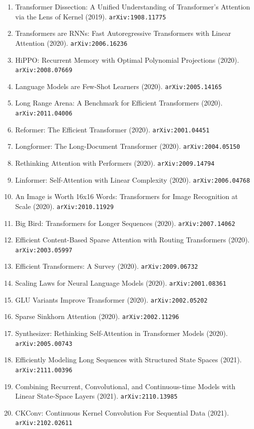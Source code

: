 \documentclass[11pt]{article}
\begin{document}
\begin{enumerate}
  \item Transformer Dissection: A Unified Understanding of Transformer's
  Attention via the Lens of Kernel (2019). \texttt{arXiv:1908.11775}
  \item Transformers are RNNs: Fast Autoregressive Transformers with Linear
  Attention (2020). \texttt{arXiv:2006.16236}
  \item HiPPO: Recurrent Memory with Optimal Polynomial Projections (2020). \texttt{arXiv:2008.07669}
  \item Language Models are Few-Shot Learners (2020). \texttt{arXiv:2005.14165}
  \item Long Range Arena: A Benchmark for Efficient Transformers (2020). \texttt{arXiv:2011.04006}
  \item Reformer: The Efficient Transformer (2020). \texttt{arXiv:2001.04451}
  \item Longformer: The Long-Document Transformer (2020). \texttt{arXiv:2004.05150}
  \item Rethinking Attention with Performers (2020). \texttt{arXiv:2009.14794}
  \item Linformer: Self-Attention with Linear Complexity (2020). \texttt{arXiv:2006.04768}
  \item An Image is Worth 16x16 Words: Transformers for Image Recognition at
  Scale (2020). \texttt{arXiv:2010.11929}
  \item Big Bird: Transformers for Longer Sequences (2020). \texttt{arXiv:2007.14062}
  \item Efficient Content-Based Sparse Attention with Routing Transformers (2020). \texttt{arXiv:2003.05997}
  \item Efficient Transformers: A Survey (2020). \texttt{arXiv:2009.06732}
  \item Scaling Laws for Neural Language Models (2020). \texttt{arXiv:2001.08361}
  \item GLU Variants Improve Transformer (2020). \texttt{arXiv:2002.05202}
  \item Sparse Sinkhorn Attention (2020). \texttt{arXiv:2002.11296}
  \item Synthesizer: Rethinking Self-Attention in Transformer Models (2020). \texttt{arXiv:2005.00743}
  \item Efficiently Modeling Long Sequences with Structured State Spaces (2021). \texttt{arXiv:2111.00396}
  \item Combining Recurrent, Convolutional, and Continuous-time Models with
  Linear State-Space Layers (2021). \texttt{arXiv:2110.13985}
  \item CKConv: Continuous Kernel Convolution For Sequential Data (2021). \texttt{arXiv:2102.02611}

\end{enumerate}
\end{document}
